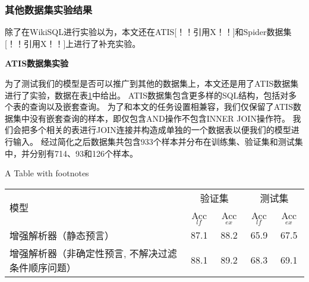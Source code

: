 \subsubsection{其他数据集实验结果}

除了在WikiSQL进行实验以为，本文还在ATIS[！！引用X！！]和Spider数据集[！！引用X！！]上进行了补充实验。

\textbf{ATIS数据集实验}

为了测试我们的模型是否可以推广到其他的数据集上，本文还是用了ATIS数据集进行了实验，数据在表\ref{tab:asjjsdsyjg}中给出。
ATIS数据集包含更多样的SQL结构，包括对多个表的查询以及嵌套查询。
为了和本文的任务设置相兼容，我们仅保留了ATIS数据集中没有嵌套查询的样本，即仅包含AND操作不包含INNER JOIN操作符。
我们会把多个相关的表进行JOIN连接并构造成单独的一个数据表以便我们的模型进行输入。
经过简化之后数据集共包含933个样本并分布在训练集、验证集和测试集中，并分别有714、93和126个样本。

\begin{table}[!htpb]
    {A Table with footnotes}
  \label{tab:asjjsdsyjg}
  \centering
  \begin{threeparttable}[b]
     \begin{tabular}{lcccc}
      \toprule
      \multirow{2}{10mm}{模型}&\multicolumn{2}{c}{验证集} & \multicolumn{2}{c}{测试集}\\
      \cmidrule(lr){2-3}\cmidrule(lr){4-5}
      & Acc$_{lf}$ & Acc$_{ex}$ & Acc$_{lf}$ & Acc$_{ex}$\\
      \midrule
      增强解析器（静态预言） & 87.1 & 88.2 & 65.9 & 67.5\\
      增强解析器（非确定性预言, 不解决过滤条件顺序问题） & 88.1 & 89.2 & 68.3 & 69.1\\
      \bottomrule
    \end{tabular}
  \end{threeparttable}
\end{table}

